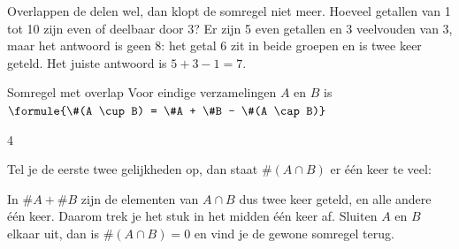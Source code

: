 Overlappen de delen wel, dan klopt de somregel niet meer. Hoeveel getallen van 1 tot 10 zijn even of deelbaar door 3? Er zijn 5 even getallen en 3 veelvouden van 3, maar het antwoord is geen 8: het getal 6 zit in beide groepen en is twee keer geteld. Het juiste antwoord is $5 + 3 - 1 = 7$.

\begin{theorie}
\begin{stelling}{Somregel met overlap}
Voor eindige verzamelingen $A$ en $B$ is \quad $\formule{\#(A \cup B) = \#A + \#B - \#(A \cap B)}$
\end{stelling}

\begin{alleenvoor}{4}
\begin{bewijs}
Tel je de eerste twee gelijkheden op, dan staat $\#(A \cap B)$ er één keer te veel:
\end{bewijs}
\end{alleenvoor}
\end{theorie}

In $\#A + \#B$ zijn de elementen van $A \cap B$ dus twee keer geteld, en alle andere één keer. Daarom trek je het stuk in het midden één keer af. Sluiten $A$ en $B$ elkaar uit, dan is $\#(A \cap B) = 0$ en vind je de gewone somregel terug.

